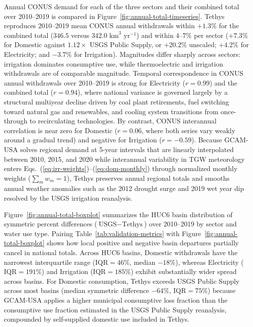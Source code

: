 \documentclass[fleqn,10pt]{wlscirep}
\begin{document}
Annual CONUS demand for each of the three sectors and their combined total over 2010--2019 is compared in Figure~\ref{fig:annual-total-timeseries}. Tethys reproduces 2010--2019 mean CONUS annual withdrawals within $+1.3\%$ for the combined total ($346.5$ versus $342.0\text{ km}^3\text{ yr}^{-1}$) and within $4$--$7\%$ per sector ($+7.3\%$ for Domestic against $1.12\times$ USGS Public Supply, or $+20.2\%$ unscaled; $+4.2\%$ for Electricity; and $-3.7\%$ for Irrigation). Magnitudes differ sharply across sectors: irrigation dominates consumptive use, while thermoelectric and irrigation withdrawals are of comparable magnitude. Temporal correspondence in CONUS annual withdrawals over 2010--2019 is strong for Electricity ($r=0.99$) and the combined total ($r=0.94$), where national variance is governed largely by a structural multiyear decline driven by coal plant retirements, fuel switching toward natural gas and renewables, and cooling system transitions from once-through to recirculating technologies\cite{skinnerWaterWithdrawalConsumption2025}. By contrast, CONUS interannual correlation is near zero for Domestic ($r=0.06$, where both series vary weakly around a gradual trend) and negative for Irrigation ($r=-0.59$). Because GCAM-USA solves regional demand at 5-year intervals that are linearly interpolated between 2010, 2015, and 2020 while interannual variability in TGW meteorology enters Eqs.~(\ref{eq:irr-weights})--(\ref{eq:dom-monthly}) through normalized monthly weights ($\sum_m w_m = 1$), Tethys preserves annual regional totals and smooths annual weather anomalies such as the 2012 drought surge and 2019 wet year dip resolved by the USGS irrigation reanalysis\cite{Martin2025JoH,Haynes2023USGS}.

Figure~\ref{fig:annual-total-boxplot} summarizes the HUC6 basin distribution of symmetric percent differences ($\text{USGS} - \text{Tethys}$) over 2010--2019 by sector and water use type. Pairing Table~\ref{tab:validation-metrics} with Figure~\ref{fig:annual-total-boxplot} shows how local positive and negative basin departures partially cancel in national totals. Across HUC6 basins, Domestic withdrawals have the narrowest interquartile range ($\mathrm{IQR}=46\%$, median $-18\%$), whereas Electricity ($\mathrm{IQR}=191\%$) and Irrigation ($\mathrm{IQR}=185\%$) exhibit substantially wider spread across basins. For Domestic consumption, Tethys exceeds USGS Public Supply across most basins (median symmetric difference $-64\%$, $\mathrm{IQR}=75\%$) because GCAM-USA applies a higher municipal consumptive loss fraction than the consumptive use fraction estimated in the USGS Public Supply reanalysis, compounded by self-supplied domestic use included in Tethys.
\end{document}
